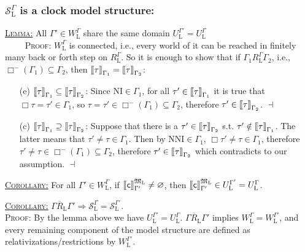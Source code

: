 \documentclass[xcolor=x11names]{beamer}
\newcommand{\wintension}[3][]{{[}\hspace{-.46mm}{[} {#3}{]}\hspace{-.46mm}{]}^{\mathfrak{#1}}_{#2}}
\begin{document}
\begin{frame}[t]
\footnotesize
	\frametitle{$\mathcal S_{\mathrm{L}}^\Gamma$ is a clock model structure:}

\underline{\textsc{Lemma:}} All $\Gamma'\in W_{\mathrm L}^\Gamma$ share the same domain $U_{\mathrm{L}}^{\Gamma'}=U_{\mathrm{L}}^{\Gamma}$
\\ $\qquad$ \textsc{Proof:} $W_{\mathrm L}^\Gamma$ is connected, i.e., every world of it can be reached in finitely many back or forth step on $R_{\mathrm L}^\Gamma$. So it is enough to show that if $\Gamma_1 R_{\mathrm L}^\Gamma \Gamma_2$, i.e., $\Box ^- (\Gamma_1)\subseteq \Gamma_2$, then $\wintension{\Gamma_1}{\tau} = \wintension{\Gamma_2}{\tau}$:
    \begin{itemize}
     \item[(e)] $\wintension{\Gamma_1}{\tau} \subseteq \wintension{\Gamma_2}{\tau}$: Since $\mathrm{NI}\in \Gamma_1$, for all $\tau'\in \wintension{\Gamma_1}{\tau}$ it is true that $\Box \tau=\tau'\in \Gamma_1$, so $\tau=\tau'\in \Box^-(\Gamma_1)\subseteq \Gamma_2$, therefore $\tau'\in \wintension{\Gamma_2}{\tau}$. \hfill $\dashv$
     \item[(c)] $\wintension{\Gamma_1}{\tau} \supseteq \wintension{\Gamma_2}{\tau}$: Suppose that there is a $\tau'\in \wintension{\Gamma_2}{\tau}$ s.t. $\tau'\notin \wintension{\Gamma_1}{\tau}$. The latter means that $\tau'\neq \tau\in \Gamma_1$. Then by $\mathrm{NNI}\in \Gamma_1$, $\Box \tau'\neq \tau\in \Gamma_1$, therefore $\tau'\neq \tau\in \Box^-(\Gamma_1)\subseteq \Gamma_2$, therefore $\tau'\in \wintension{\Gamma_2}{\tau}$ which contradicts to our assumption. \hfill $\dashv$
    \end{itemize}
\pause

\underline{\textsc{Corollary:}} For all $\Gamma'\in W_{\mathrm L}^\Gamma$, if $\wintension[M_{\mathrm{L}}]{\Gamma'}{\mathsf c}\neq \varnothing$, then $\wintension[M_{\mathrm{L}}]{\Gamma'}{\mathsf c}\in U_{\mathrm{L}}^{\Gamma'} =U_{\mathrm{L}}^{\Gamma}$.

\underline{\textsc{Corollary:}} $\Gamma \overline R_{\mathrm{L}}\Gamma' \Longrightarrow \mathcal S_{\mathrm{L}}^{\Gamma} = \mathcal S_{\mathrm{L}}^{\Gamma'}$.
\\ \textsc{Proof:} By the lemma above we have $U_{\mathrm{L}}^{\Gamma'}=U_{\mathrm{L}}^{\Gamma}$. $\Gamma \overline R_{\mathrm{L}}\Gamma'$ implies $W_{\mathrm{L}}^{\Gamma} = W_{\mathrm{L}}^{\Gamma'}$, and every remaining component of the model structure are defined as relativizations/restrictions by $W_{\mathrm{L}}^{\Gamma'}$.

\end{frame}
\end{document}
